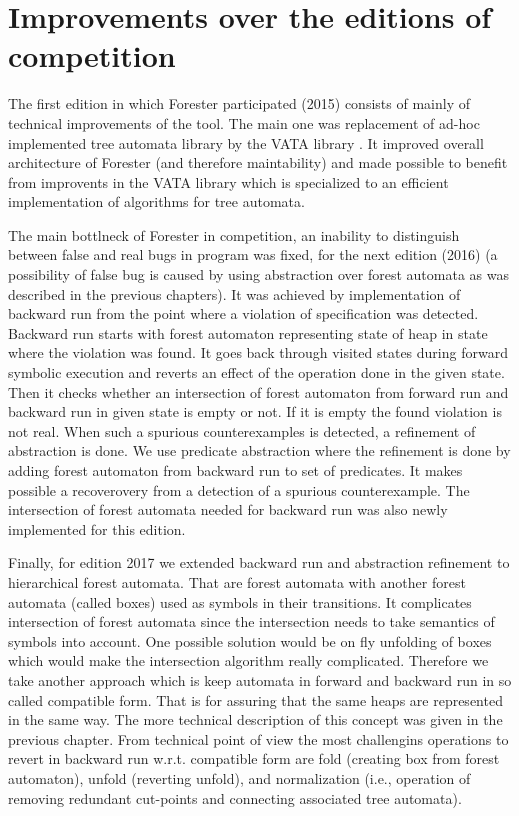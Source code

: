 {\section{Improvements over the editions of competition}
The first edition in which Forester participated (2015) consists of mainly of technical improvements of the tool.
The main one was replacement of ad-hoc implemented tree automata library by the VATA library \cite{libvata}.
It improved overall architecture of Forester (and therefore maintability) and made possible
to benefit from improvents in the VATA library which is specialized to an efficient implementation of
algorithms for tree automata.

The main bottlneck of Forester in competition, an inability to distinguish between false and real bugs in program
was fixed, for the next edition (2016) (a possibility of false bug is caused by using abstraction over forest
automata as was described in the previous chapters).
It was achieved by implementation of backward run from the point where a violation of specification was detected.
Backward run starts with forest automaton representing state of heap in state where the violation was found.
It goes back through visited states during forward symbolic execution and reverts an effect of the operation done
in the given state.
Then it checks whether an intersection of forest automaton from forward run and backward run in given state is empty or not.
If it is empty the found violation is not real.
When such a spurious counterexamples is detected, a refinement of abstraction is done.
We use predicate abstraction where the refinement is done by adding forest automaton from backward run to set of predicates.
It makes possible a recoverovery from a detection of a spurious counterexample.
The intersection of forest automata needed for backward run was also newly implemented for this edition.

Finally, for edition 2017 we extended backward run and abstraction refinement to hierarchical forest automata.
That are forest automata with another forest automata (called boxes) used as symbols in their transitions.
It complicates intersection of forest automata since the intersection needs to take semantics of symbols into account.
One possible solution would be on fly unfolding of boxes which would make the intersection algorithm really complicated.
Therefore we take another approach which is keep automata in forward and backward run in so called compatible form.
That is for assuring that the same heaps are represented in the same way.
The more technical description of this concept was given in the previous chapter.
From technical point of view the most challengins operations to revert in backward run
w.r.t. compatible form are fold (creating box from forest automaton), unfold (reverting unfold),
and normalization (i.e., operation of removing redundant cut-points and connecting associated tree automata).

}
